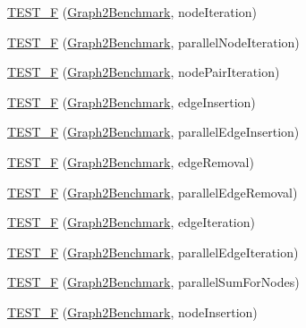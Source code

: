\begin{DoxyCompactItemize}
\item 
\hyperlink{namespace_ensemble_clustering_a937a7bfd164f277a7918c224a234ad79}{T\-E\-S\-T\-\_\-\-F} (\hyperlink{class_ensemble_clustering_1_1_graph2_benchmark}{Graph2\-Benchmark}, node\-Iteration)
\item 
\hyperlink{namespace_ensemble_clustering_a34430517ea6f6e70392e68f9e02302ce}{T\-E\-S\-T\-\_\-\-F} (\hyperlink{class_ensemble_clustering_1_1_graph2_benchmark}{Graph2\-Benchmark}, parallel\-Node\-Iteration)
\item 
\hyperlink{namespace_ensemble_clustering_a627a9851ab85673a28b4984228f7fba9}{T\-E\-S\-T\-\_\-\-F} (\hyperlink{class_ensemble_clustering_1_1_graph2_benchmark}{Graph2\-Benchmark}, node\-Pair\-Iteration)
\item 
\hyperlink{namespace_ensemble_clustering_abe8b8268c5b0492e15860c585b9322ed}{T\-E\-S\-T\-\_\-\-F} (\hyperlink{class_ensemble_clustering_1_1_graph2_benchmark}{Graph2\-Benchmark}, edge\-Insertion)
\item 
\hyperlink{namespace_ensemble_clustering_ae217bea22747236abf8b6b287f5e3930}{T\-E\-S\-T\-\_\-\-F} (\hyperlink{class_ensemble_clustering_1_1_graph2_benchmark}{Graph2\-Benchmark}, parallel\-Edge\-Insertion)
\item 
\hyperlink{namespace_ensemble_clustering_aa425dfc619697ec9675332c7a9ffe321}{T\-E\-S\-T\-\_\-\-F} (\hyperlink{class_ensemble_clustering_1_1_graph2_benchmark}{Graph2\-Benchmark}, edge\-Removal)
\item 
\hyperlink{namespace_ensemble_clustering_a5237de9e410f56ac22dc4b0331821aa7}{T\-E\-S\-T\-\_\-\-F} (\hyperlink{class_ensemble_clustering_1_1_graph2_benchmark}{Graph2\-Benchmark}, parallel\-Edge\-Removal)
\item 
\hyperlink{namespace_ensemble_clustering_a3a783365e94a02aae6d4756e1134a40d}{T\-E\-S\-T\-\_\-\-F} (\hyperlink{class_ensemble_clustering_1_1_graph2_benchmark}{Graph2\-Benchmark}, edge\-Iteration)
\item 
\hyperlink{namespace_ensemble_clustering_acb321e51f9c12540d616bd3599e16240}{T\-E\-S\-T\-\_\-\-F} (\hyperlink{class_ensemble_clustering_1_1_graph2_benchmark}{Graph2\-Benchmark}, parallel\-Edge\-Iteration)
\item 
\hyperlink{namespace_ensemble_clustering_aa2e95e6ab79056db255a24b2291aa2a8}{T\-E\-S\-T\-\_\-\-F} (\hyperlink{class_ensemble_clustering_1_1_graph2_benchmark}{Graph2\-Benchmark}, parallel\-Sum\-For\-Nodes)
\item 
\hyperlink{namespace_ensemble_clustering_a5532e699599c2f9364552fe5bcb9ed5e}{T\-E\-S\-T\-\_\-\-F} (\hyperlink{class_ensemble_clustering_1_1_graph2_benchmark}{Graph2\-Benchmark}, node\-Insertion)

\end{DoxyCompactItemize}
